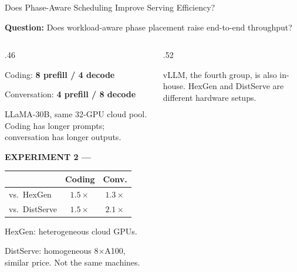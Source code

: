 \begin{frame}[t,label=main_ts_results]{Does Phase-Aware Scheduling Improve Serving Efficiency?}
{\footnotesize\textbf{Question:} Does workload-aware phase placement raise end-to-end throughput?\par}
\vspace{.04cm}
\begin{columns}[T,onlytextwidth]
\begin{column}{.46\textwidth}
\par
{\footnotesize\textbf{}\par}
\vspace{.04cm}
{\footnotesize Coding: \textbf{8 prefill / 4 decode}\par}
{\footnotesize Conversation: \textbf{4 prefill / 8 decode}\par}
\vspace{.04cm}
{\footnotesize LLaMA-30B, same 32-GPU cloud pool. Coding has longer prompts; conversation has longer outputs.\par}
\vspace{.08cm}
{\scriptsize\bfseries\color{Accent}EXPERIMENT 2 --- }\par
\vspace{.02cm}
{\footnotesize\renewcommand{\arraystretch}{1.08}
\begin{tabular}{@{}lcc@{}}\toprule
 & \textbf{Coding} & \textbf{Conv.}\\\midrule
vs.\ HexGen & $1.5\times$ & $1.3\times$\\
vs.\ DistServe & $1.5\times$ & $2.1\times$\\\bottomrule
\end{tabular}\par}
\vspace{.06cm}
{\footnotesize HexGen: heterogeneous cloud GPUs.\par
DistServe: homogeneous 8$\times$A100, similar price. Not the same machines.\par}
\end{column}
\begin{column}{.52\textwidth}
\vspace{.06cm}
{\footnotesize vLLM, the fourth group, is also in-house. HexGen and DistServe are different hardware setups.\par}
\end{column}
\end{columns}
\vspace{.04cm}
\end{frame}

